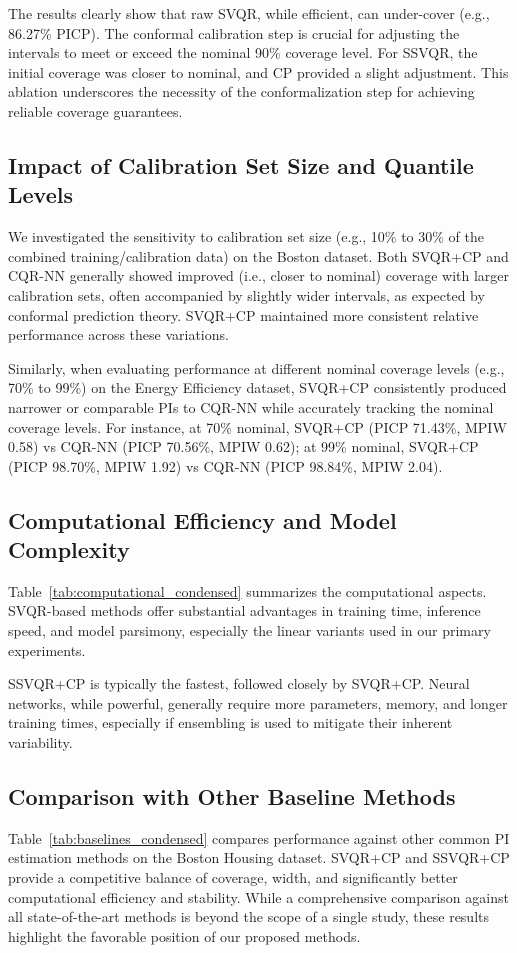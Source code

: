 \documentclass{article}
\begin{document}
The results clearly show that raw SVQR, while efficient, can under-cover (e.g., 86.27\% PICP). The conformal calibration step is crucial for adjusting the intervals to meet or exceed the nominal 90\% coverage level. For SSVQR, the initial coverage was closer to nominal, and CP provided a slight adjustment. This ablation underscores the necessity of the conformalization step for achieving reliable coverage guarantees.

\subsection{Impact of Calibration Set Size and Quantile Levels}
We investigated the sensitivity to calibration set size (e.g., 10\% to 30\% of the combined training/calibration data) on the Boston dataset. Both SVQR+CP and CQR-NN generally showed improved (i.e., closer to nominal) coverage with larger calibration sets, often accompanied by slightly wider intervals, as expected by conformal prediction theory. SVQR+CP maintained more consistent relative performance across these variations. 

Similarly, when evaluating performance at different nominal coverage levels (e.g., 70\% to 99\%) on the Energy Efficiency dataset, SVQR+CP consistently produced narrower or comparable PIs to CQR-NN while accurately tracking the nominal coverage levels. For instance, at 70\% nominal, SVQR+CP (PICP 71.43\%, MPIW 0.58) vs CQR-NN (PICP 70.56\%, MPIW 0.62); at 99\% nominal, SVQR+CP (PICP 98.70\%, MPIW 1.92) vs CQR-NN (PICP 98.84\%, MPIW 2.04).

\subsection{Computational Efficiency and Model Complexity}
Table~\ref{tab:computational_condensed} summarizes the computational aspects. SVQR-based methods offer substantial advantages in training time, inference speed, and model parsimony, especially the linear variants used in our primary experiments.

SSVQR+CP is typically the fastest, followed closely by SVQR+CP. Neural networks, while powerful, generally require more parameters, memory, and longer training times, especially if ensembling is used to mitigate their inherent variability.

\subsection{Comparison with Other Baseline Methods}
Table~\ref{tab:baselines_condensed} compares performance against other common PI estimation methods on the Boston Housing dataset. SVQR+CP and SSVQR+CP provide a competitive balance of coverage, width, and significantly better computational efficiency and stability. While a comprehensive comparison against all state-of-the-art methods is beyond the scope of a single study, these results highlight the favorable position of our proposed methods.
\end{document}
